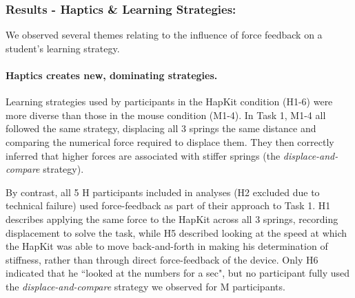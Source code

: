 \subsubsection{Results - Haptics \& Learning Strategies:}
We observed several themes relating to the influence of force feedback %
on a student's learning strategy. %


\paragraph{Haptics creates new, dominating strategies.} %
%
Learning strategies used by participants %
in the HapKit condition (H1-6) were more diverse than those in the mouse condition (M1-4).
In Task 1, M1-4 all followed the same strategy, displacing all 3 springs the same distance and comparing the numerical force required to displace them. They then correctly inferred that higher forces are associated with stiffer springs (the \textit{displace-and-compare} strategy).

By contrast, all 5 H participants included in analyses (H2 excluded due to technical failure) used force-feedback as part of their  approach to Task 1. 
H1 describes applying the same force to the HapKit across all 3 springs, recording displacement to solve the task, while
H5 described looking at the speed at which the HapKit was able to move back-and-forth in making his determination of stiffness, rather than through direct force-feedback of the device. Only H6 indicated that he ``looked at the numbers for a sec", but no participant fully used the \textit{displace-and-compare} strategy we observed for M participants. 

